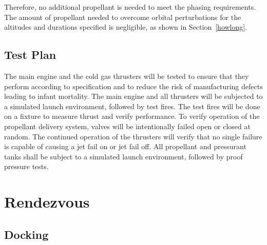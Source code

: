 \documentclass[paper=letter, fontsize=11pt]{scrartcl} %
\numberwithin{equation}{section} %
\numberwithin{figure}{section} %
\numberwithin{table}{section} %
\begin{document}
Therefore, no additional propellant is needed to meet the phasing requirements. The amount of propellant needed to overcome orbital perturbations for the altitudes and durations specified is negligible, as shown in Section~\ref{howlong}.

\subsection{Test Plan}
The main engine and the cold gas thrusters will be tested to ensure that they perform according to specification and to reduce the risk of manufacturing defects leading to infant mortality. The main engine and all thrusters will be subjected to a simulated launch environment, followed by test fires. The test fires will be done on a fixture to measure thrust and verify performance. To verify operation of the propellant delivery system, valves will be intentionally failed open or closed at random.  The continued operation of the thrusters will verify that no single failure is capable of causing a jet fail on or jet fail off. All propellant and pressurant tanks shall be subject to a simulated launch environment, followed by proof pressure tests.



\section{Rendezvous}

\subsection{Docking}
\end{document}
